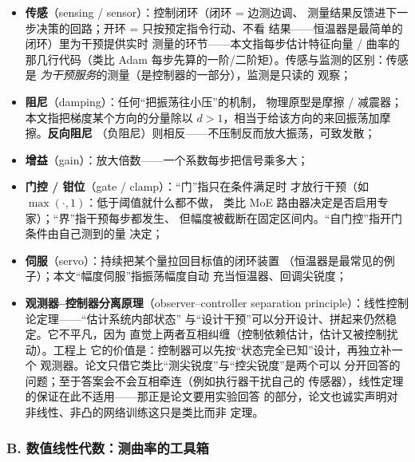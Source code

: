 \begin{itemize}
  \item \textbf{传感}（sensing / sensor）：控制闭环（闭环 = 边测边调、
        测量结果反馈进下一步决策的回路；开环 = 只按预定指令行动、不看
        结果——恒温器是最简单的闭环）里为干预提供实时
        测量的环节——本文指每步估计特征向量 / 曲率的那几行代码（类比
        Adam 每步先算的一阶/二阶矩）。传感与监测的区别：传感是
        \emph{为干预服务}的测量（是控制器的一部分），监测是只读的
        观察；
  \item \textbf{阻尼}（damping）：任何``把振荡往小压''的机制，
        物理原型是摩擦 / 减震器；本文指把梯度某个方向的分量除以
        $d>1$，相当于给该方向的来回振荡加摩擦。\textbf{反向阻尼}
        （负阻尼）则相反——不压制反而放大振荡，可致发散；
  \item \textbf{增益}（gain）：放大倍数——一个系数每步把信号乘多大；
  \item \textbf{门控 / 钳位}（gate / clamp）：``门''指只在条件满足时
        才放行干预（如 $\max(\cdot,1)$：低于阈值就什么都不做，
        类比 MoE 路由器决定是否启用专家）；``界''指干预每步都发生、
        但幅度被截断在固定区间内。``自门控''指开门条件由自己测到的量
        决定；
  \item \textbf{伺服}（servo）：持续把某个量拉回目标值的闭环装置
        （恒温器是最常见的例子）；本文``幅度伺服''指振荡幅度自动
        充当恒温器、回调尖锐度；
  \item \textbf{观测器--控制器分离原理}（observer--controller
        separation principle）：线性控制论定理——``估计系统内部状态''
        与``设计干预''可以分开设计、拼起来仍然稳定。它不平凡，因为
        直觉上两者互相纠缠（控制依赖估计，估计又被控制扰动）。工程上
        它的价值是：控制器可以先按``状态完全已知''设计，再独立补一个
        观测器。论文只借它类比``测尖锐度''与``控尖锐度''是两个可以
        分开回答的问题；至于答案会不会互相牵连（例如执行器干扰自己的
        传感器），线性定理的保证在此不适用——那正是论文要用实验回答
        的部分，论文也诚实声明对非线性、非凸的网络训练这只是类比而非
        定理。
\end{itemize}

\subsubsection*{B. 数值线性代数：测曲率的工具箱}


